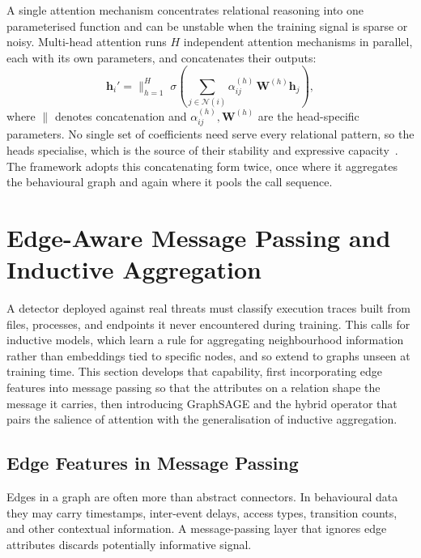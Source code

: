 \documentclass[%
    BCOR=10mm,
    DIV=13,
    toc=bibliography,
    toc=listof,
    oneside,
    12pt,
]{scrbook}
\begin{document}
A single attention mechanism concentrates relational reasoning into one
parameterised function and can be unstable when the training signal is sparse
or noisy. Multi-head attention runs $H$ independent attention mechanisms in
parallel, each with its own parameters, and concatenates their outputs:
\begin{equation} \mathbf{h}_i' = \Big\|_{h=1}^{H}\; \sigma\!\left( \sum_{j \in
\mathcal{N}(i)} \alpha_{ij}^{(h)}\, \mathbf{W}^{(h)} \mathbf{h}_j \right),
\label{eq:multihead} \end{equation} where $\|$ denotes concatenation and
$\alpha_{ij}^{(h)}, \mathbf{W}^{(h)}$ are the head-specific parameters. No
single set of coefficients need serve every relational pattern, so the heads
specialise, which is the source of their stability and expressive
capacity~\cite{velickovic2018gat, vaswani2017}. The framework adopts this
concatenating form twice, once where it aggregates the behavioural graph and
again where it pools the call sequence.

\section{Edge-Aware Message Passing and Inductive Aggregation}
\label{sec:edge_inductive}

A detector deployed against real threats must classify execution traces built
from files, processes, and endpoints it never encountered during training. This
calls for inductive models, which learn a rule for aggregating neighbourhood
information rather than embeddings tied to specific nodes, and so extend to
graphs unseen at training time. This section develops that capability, first
incorporating edge features into message passing so that the attributes on a
relation shape the message it carries, then introducing GraphSAGE and the
hybrid operator that pairs the salience of attention with the generalisation of
inductive aggregation.

\subsection{Edge Features in Message Passing}
\label{subsec:edge_features}

Edges in a graph are often more than abstract connectors. In behavioural data
they may carry timestamps, inter-event delays, access types, transition
counts, and other contextual information. A message-passing layer that
ignores edge attributes discards potentially informative signal.
\end{document}
